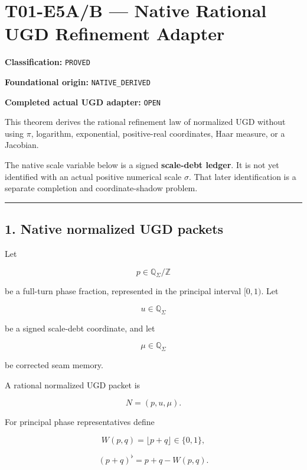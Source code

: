 \hypertarget{t01-e5ab-native-rational-ugd-refinement-adapter}{%
\chapter{T01-E5A/B --- Native Rational UGD Refinement Adapter}\label{t01-e5ab-native-rational-ugd-refinement-adapter}}

\textbf{Classification:} \texttt{PROVED}

\textbf{Foundational origin:} \texttt{NATIVE\_DERIVED}

\textbf{Completed actual UGD adapter:} \texttt{OPEN}

This theorem derives the rational refinement law of normalized UGD without using
\(\pi\), logarithm, exponential, positive-real coordinates, Haar measure, or a
Jacobian.

The native scale variable below is a signed \textbf{scale-debt ledger}. It is not yet
identified with an actual positive numerical scale \(\sigma\). That later
identification is a separate completion and coordinate-shadow problem.

\begin{center}\rule{0.5\linewidth}{0.5pt}\end{center}

\hypertarget{native-normalized-ugd-packets}{%
\section{1. Native normalized UGD packets}\label{native-normalized-ugd-packets}}

Let

\[
p\in\mathbb Q_\Sigma/\mathbb Z
\]

be a full-turn phase fraction, represented in the principal interval
\([0,1)\). Let

\[
u\in\mathbb Q_\Sigma
\]

be a signed scale-debt coordinate, and let

\[
\mu\in\mathbb Q_\Sigma
\]

be corrected seam memory.

A rational normalized UGD packet is

\[
N=(p,u,\mu).
\tag{1.1}
\]

For principal phase representatives define

\[
W(p,q)=\lfloor p+q\rfloor\in\{0,1\},
\tag{1.2}
\]

\[
(p+q)^\flat=p+q-W(p,q).
\tag{1.3}
\]

